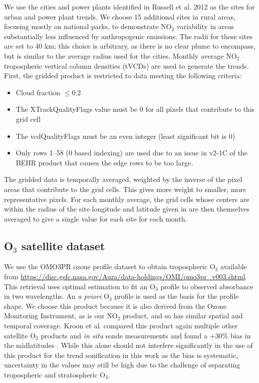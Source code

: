 \documentclass[a4paper,10pt,oneside]{article}
\newcommand{\ce}[1]{$\mathrm{#1}$}
\begin{document}
\begin{sloppy}
	We use the cities and power plants identified in Russell et al. 2012 \cite{russell12} as the sites for urban and power plant trends. We choose 15 additional sites in rural areas, focusing mostly on national parks, to demonstrate \ce{NO_2} variability in areas substantially less influenced by anthropogenic emissions. The radii for these sites are set to 40 km; this choice is arbitrary, as there is no clear plume to encompass, but is similar to the average radius used for the cities. Monthly average \ce{NO_2} tropospheric vertical column densities (tVCDs) are used to generate the trends. First, the gridded product is restricted to data meeting the following criteria:
	
	\begin{itemize}
	\item Cloud fraction $\leq 0.2$
	\item The XTrackQualityFlags value must be 0 for all pixels that contribute to this grid cell
	\item The vcdQualityFlags must be an even integer (least significant bit is 0)
	\item Only rows 1--58 (0 based indexing) are used due to an issue in v2-1C of the BEHR product that causes the edge rows to be too large.
	\end{itemize}
	
	The gridded data is temporally averaged, weighted by the inverse of the pixel areas that contribute to the grid cells. This gives more weight to smaller, more representative pixels.  For each monthly average, the grid cells whose centers are within the radius of the site longitude and latitude given in \cite{russell12} are then themselves averaged to give a single value for each site for each month.

\subsection{O$_3$ satellite dataset}

	We use the OMO3PR ozone profile dataset to obtain tropospheric \ce{O_3} available from \url{https://disc.gsfc.nasa.gov/Aura/data-holdings/OMI/omo3pr_v003.shtml}.   This retrieval uses optimal estimation to fit an \ce{O_3} profile to observed absorbance in two wavelengths. An \emph{a priori} \ce{O_3} profile is used as the basis for the profile shape.  We choose this product because it is also derived from the Ozone Monitoring Instrument, as is our \ce{NO_2} product, and so has similar spatial and temporal coverage. Kroon et al. compared this product again multiple other satellite \ce{O_3} products and \emph{in situ} sonde measurements and found a +30\% bias in the midlatitudes  \cite{kroon11}. While this alone should not interfere significantly in the use of this product for the trend sonification in this work as the bias is systematic, uncertainty in the values may still be high due to the challenge of separating tropospheric and stratospheric \ce{O_3}.
	

\end{sloppy}
\end{document}
